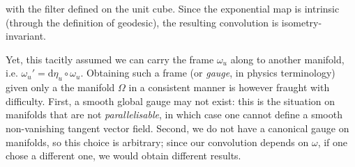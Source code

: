 
with the filter defined on the unit cube. Since the exponential map is intrinsic (through the definition of geodesic), the resulting convolution is isometry-invariant. 


Yet, this tacitly assumed  we can carry the frame $\omega_u$ along to another manifold, i.e. $\omega_u' = \mathrm{d}\eta_u \circ \omega_u$.
%
Obtaining
such a frame (or \emph{gauge}, in physics terminology) given only a the manifold $\Omega$ in a consistent manner is however fraught with difficulty.
%
First, a smooth global gauge may not exist: this is the situation on manifolds that are not \emph{parallelisable},   in which case one cannot define a smooth non-vanishing tangent vector field.
%
%
Second, we do not have a canonical gauge on manifolds, so this choice is arbitrary; since our convolution depends on $\omega$, if one chose a different one, we would obtain different results. 

